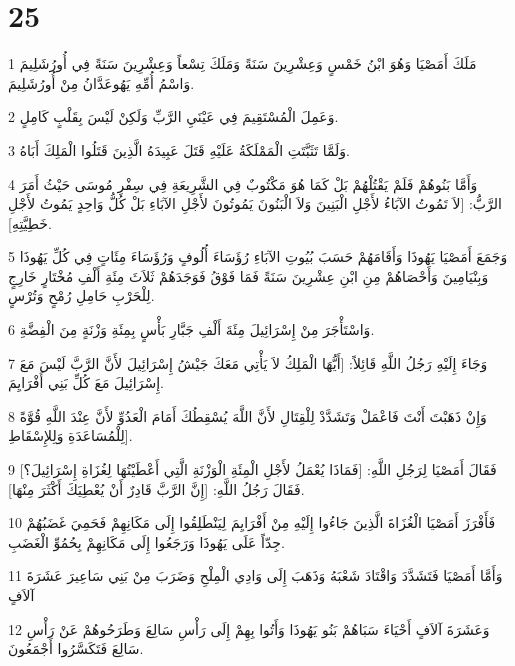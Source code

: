 \chapter{25}

\par 1 مَلَكَ أَمَصْيَا وَهُوَ ابْنُ خَمْسٍ وَعِشْرِينَ سَنَةً وَمَلَكَ تِسْعاً وَعِشْرِينَ سَنَةً فِي أُورُشَلِيمَ وَاسْمُ أُمِّهِ يَهُوعَدَّانُ مِنْ أُورُشَلِيمَ.
\par 2 وَعَمِلَ الْمُسْتَقِيمَ فِي عَيْنَيِ الرَّبِّ وَلَكِنْ لَيْسَ بِقَلْبٍ كَامِلٍ.
\par 3 وَلَمَّا تَثَبَّتَتِ الْمَمْلَكَةُ عَلَيْهِ قَتَلَ عَبِيدَهُ الَّذِينَ قَتَلُوا الْمَلِكَ أَبَاهُ.
\par 4 وَأَمَّا بَنُوهُمْ فَلَمْ يَقْتُلْهُمْ بَلْ كَمَا هُوَ مَكْتُوبٌ فِي الشَّرِيعَةِ فِي سِفْرِ مُوسَى حَيْثُ أَمَرَ الرَّبُّ: [لاَ تَمُوتُ الآبَاءُ لأَجْلِ الْبَنِينَ وَلاَ الْبَنُونَ يَمُوتُونَ لأَجْلِ الآبَاءِ بَلْ كُلُّ وَاحِدٍ يَمُوتُ لأَجْلِ خَطِيَّتِهِ].
\par 5 وَجَمَعَ أَمَصْيَا يَهُوذَا وَأَقَامَهُمْ حَسَبَ بُيُوتِ الآبَاءِ رُؤَسَاءَ أُلُوفٍ وَرُؤَسَاءَ مِئَاتٍ فِي كُلِّ يَهُوذَا وَبِنْيَامِينَ وَأَحْصَاهُمْ مِنِ ابْنِ عِشْرِينَ سَنَةً فَمَا فَوْقُ فَوَجَدَهُمْ ثَلاَثَ مِئَةِ أَلْفِ مُخْتَارٍ خَارِجٍ لِلْحَرْبِ حَامِلِ رُمْحٍ وَتُرْسٍ.
\par 6 وَاسْتَأْجَرَ مِنْ إِسْرَائِيلَ مِئَةَ أَلْفِ جَبَّارِ بَأْسٍ بِمِئَةِ وَزْنَةٍ مِنَ الْفِضَّةِ.
\par 7 وَجَاءَ إِلَيْهِ رَجُلُ اللَّهِ قَائِلاً: [أَيُّهَا الْمَلِكُ لاَ يَأْتِي مَعَكَ جَيْشُ إِسْرَائِيلَ لأَنَّ الرَّبَّ لَيْسَ مَعَ إِسْرَائِيلَ مَعَ كُلِّ بَنِي أَفْرَايِمَ.
\par 8 وَإِنْ ذَهَبْتَ أَنْتَ فَاعْمَلْ وَتَشَدَّدْ لِلْقِتَالِ لأَنَّ اللَّهَ يُسْقِطُكَ أَمَامَ الْعَدُوِّ لأَنَّ عِنْدَ اللَّهِ قُوَّةً لِلْمُسَاعَدَةِ وَلِلإِسْقَاطِ].
\par 9 فَقَالَ أَمَصْيَا لِرَجُلِ اللَّهِ: [فَمَاذَا يُعْمَلُ لأَجْلِ الْمِئَةِ الْوَزْنَةِ الَّتِي أَعْطَيْتُهَا لِغُزَاةِ إِسْرَائِيلَ؟] فَقَالَ رَجُلُ اللَّهِ: [إِنَّ الرَّبَّ قَادِرٌ أَنْ يُعْطِيَكَ أَكْثَرَ مِنْهَا].
\par 10 فَأَفْرَزَ أَمَصْيَا الْغُزَاةَ الَّذِينَ جَاءُوا إِلَيْهِ مِنْ أَفْرَايِمَ لِيَنْطَلِقُوا إِلَى مَكَانِهِمْ فَحَمِيَ غَضَبُهُمْ جِدّاً عَلَى يَهُوذَا وَرَجَعُوا إِلَى مَكَانِهِمْ بِحُمُوِّ الْغَضَبِ.
\par 11 وَأَمَّا أَمَصْيَا فَتَشَدَّدَ وَاقْتَادَ شَعْبَهُ وَذَهَبَ إِلَى وَادِي الْمِلْحِ وَضَرَبَ مِنْ بَنِي سَاعِيرَ عَشَرَةَ آلاَفٍ
\par 12 وَعَشَرَةَ آلاَفٍ أَحْيَاءَ سَبَاهُمْ بَنُو يَهُوذَا وَأَتُوا بِهِمْ إِلَى رَأْسِ سَالِعَ وَطَرَحُوهُمْ عَنْ رَأْسِ سَالِعَ فَتَكَسَّرُوا أَجْمَعُونَ.
